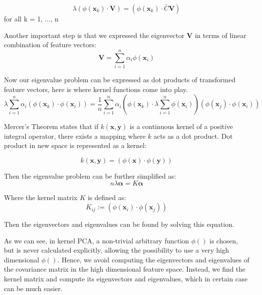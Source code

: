 \begin{equation}
\lambda(\phi(\pmb{x}_k) \cdot \pmb{V}) = (\phi(\pmb{x}_k) \cdot\bar{C} \pmb{V})
\end{equation}
for all k = 1, ..., n

Another important step is that we expressed the eigenvector $\pmb{V}$ in terms of linear combination of feature vectors:
\begin{equation}
\pmb{V} = \sum^n_{i=1}\alpha_i\phi(\pmb{x}_i)
\end{equation}

Now our eigenvalue problem can be expressed as dot products of transformed feature vectors, here is where kernel functions come into play.
\begin{equation}
\lambda\sum^n_{i=1}\alpha_i(\phi(\pmb{x}_k)\cdot\phi(\pmb{x}_i)) = \frac{1}{n}\sum^n_{i=1}\alpha_i(\phi(\pmb{x}_k)\cdot\lambda\sum^n_{i=1}\phi(\pmb{x}_i))(\phi(\pmb{x}_j)\cdot\phi(\pmb{x}_i))
\end{equation}

Mercer’s Theorem states that if $k(\pmb{x}, \pmb{y})$ is a continuous kernel of a positive integral operator, there exists a mapping where $k$ acts as a dot product.
Dot product in new space is represented as a kernel:

\begin{equation}
k(\pmb{x}, \pmb{y}) = (\phi(\pmb{x}) \cdot \phi(\pmb{y}))
\end{equation}

Then the eigenvalue problem can be further simplified as:
\begin{equation}
n\lambda\pmb{\alpha} = K\pmb{\alpha}
\end{equation}

Where the kernel matrix $K$ is defined as:
\begin{equation}
K_{ij} := (\phi(\pmb{x}_i) \cdot \phi(\pmb{x}_j))
\end{equation}

Then the eigenvectors and eigenvalues can be found by solving this equation.

As we can see, in kernel PCA, a non-trivial arbitrary function $\phi()$ is chosen, but is never calculated explicitly, allowing the possibility to use a very high dimensional $\phi()$.
Hence, we avoid computing the eigenvectors and eigenvalues of the covariance matrix in the high dimensional feature space.
Instead, we find the kernel matrix and compute its eigenvectors and eigenvalues, which in certain case can be much easier.

